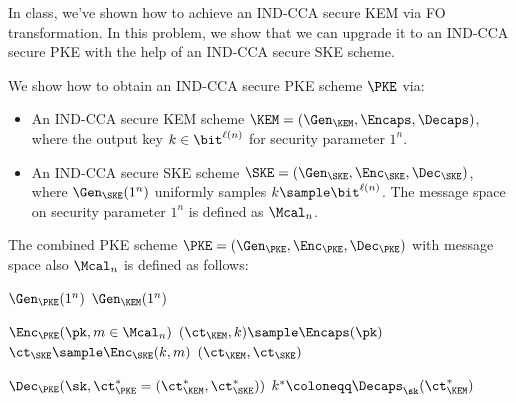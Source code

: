\begin{problem}\label{p4}
    \leavevmode\par
    In class, we've shown how to achieve an IND-CCA secure KEM via FO transformation. In this problem, we show that we can upgrade it to an IND-CCA secure PKE with the help of an IND-CCA secure SKE scheme.

    We show how to obtain an IND-CCA secure PKE scheme $\PKE$ via:
    \begin{itemize}
        \item An IND-CCA secure KEM scheme $\KEM = (\Gen_\KEM, \Encaps, \Decaps)$, where the output key $k\in\bit^{\ell(n)}$ for security parameter $1^n$.
        \item An IND-CCA secure SKE scheme $\SKE = (\Gen_\SKE, \Enc_\SKE, \Dec_\SKE)$, where $\Gen_\SKE(1^n)$ uniformly samples $k\sample \bit^{\ell(n)}$. The message space on security parameter $1^n$ is defined as $\Mcal_n$.
    \end{itemize}
    The combined PKE scheme $\PKE = (\Gen_\PKE, \Enc_\PKE, \Dec_\PKE)$ with message space also $\Mcal_n$ is defined as follows:
    \begin{simplebox}
        \small
        \noindent
        \begin{minipage}[t]{0.3\textwidth}
            \begin{algorithmic}[1]
                \Statex \textbf{$\Gen_\PKE(1^n)$}
                \Indent
                \State \Return $\Gen_\KEM(1^n)$
                \EndIndent
            \end{algorithmic}
        \end{minipage}
        \hfill
        \begin{minipage}[t]{0.32\textwidth}
            \begin{algorithmic}[1]
                \Statex \textbf{$\Enc_\PKE(\pk, m\in\Mcal_n)$}
                \Indent
                    \State $(\ct_\KEM, k)\sample \Encaps(\pk)$
                    \State $\ct_\SKE \sample \Enc_\SKE(k, m)$
                    \State \Return $(\ct_\KEM, \ct_\SKE)$ 
                \EndIndent
            \end{algorithmic}
        \end{minipage}
        \hfill
        \begin{minipage}[t]{0.36\textwidth}
            \begin{algorithmic}[1]
                \Statex \textbf{$\Dec_\PKE(\sk, \ct_\PKE^\ast=(\ct_\KEM^\ast, \ct_\SKE^\ast))$}
                \Indent
                    \State $k^\ast \coloneqq \Decaps_\sk(\ct_\KEM^\ast)$

\end{algorithmic}
\end{minipage}
\end{simplebox}
\end{problem}
